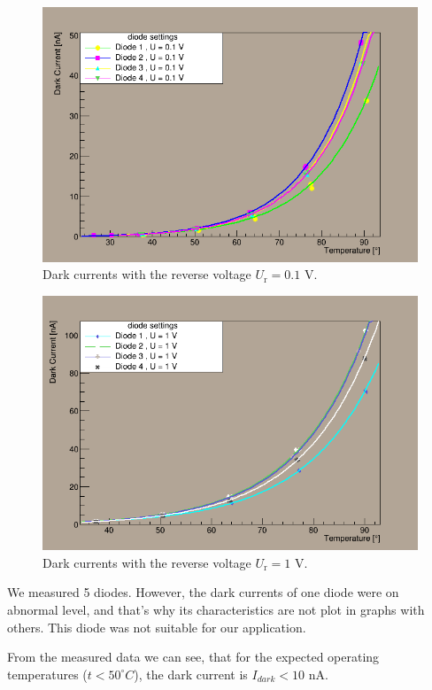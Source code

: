 \begin{figure}[H]
 \centering
 \includegraphics[scale=0.5]{./pictures/01V}
 \caption{Dark currents with the reverse voltage $U_\textrm{r}= 0.1$ V.}
 \label{01V}
\end{figure}

\begin{figure}[H]
 \centering
 \includegraphics[scale=0.5]{./pictures/1V}
 \caption{Dark currents with the reverse voltage $U_\textrm{r}= 1$ V.}
 \label{1V}
\end{figure}


We measured 5 diodes. However, the dark currents of one diode were on abnormal level, and that's why its characteristics are not plot in graphs with others. This diode was not suitable for our application.
\par

From the measured data we can see, that for the expected operating temperatures ($t < 50^{\circ}C$), the dark current is $I_{dark} < 10$ nA. 

